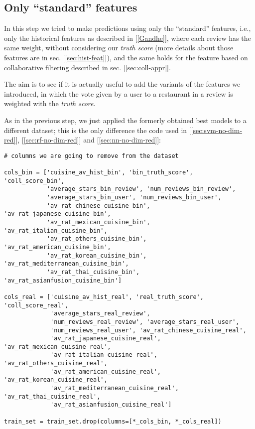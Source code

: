 \newpage
\subsection{Only ``standard'' features} \label{sec:only-std}

In this step we tried to make predictions using only the ``standard'' features, i.e., only the historical features as described in [\ref{Gandhe}], where each review has the same weight, without considering our \textit{truth score} (more details about those features are in sec. [\ref{sec:hist-feat}]), and the same holds for the feature based on collaborative filtering described in sec. [\ref{sec:coll-appr}].

The aim is to see if it is actually useful to add the variants of the features we introduced, in which the vote given by a user to a restaurant in a review is weighted with the \textit{truth score}.

As in the previous step, we just applied the formerly obtained best models to a different dataset; this is the only difference \wrt the code used in [\ref{sec:svm-no-dim-red}], [\ref{sec:rf-no-dim-red}] and [\ref{sec:nn-no-dim-red}]:
\begin{lstlisting}[caption={Removing non standard features},label={lst:only-std}]
# columns we are going to remove from the dataset

cols_bin = ['cuisine_av_hist_bin', 'bin_truth_score', 'coll_score_bin',
            'average_stars_bin_review', 'num_reviews_bin_review',
            'average_stars_bin_user', 'num_reviews_bin_user', 
            'av_rat_chinese_cuisine_bin', 'av_rat_japanese_cuisine_bin',
            'av_rat_mexican_cuisine_bin', 'av_rat_italian_cuisine_bin',
            'av_rat_others_cuisine_bin', 'av_rat_american_cuisine_bin',
            'av_rat_korean_cuisine_bin', 'av_rat_mediterranean_cuisine_bin',
            'av_rat_thai_cuisine_bin', 'av_rat_asianfusion_cuisine_bin']

cols_real = ['cuisine_av_hist_real', 'real_truth_score', 'coll_score_real',
             'average_stars_real_review', 
             'num_reviews_real_review', 'average_stars_real_user',
             'num_reviews_real_user', 'av_rat_chinese_cuisine_real',
             'av_rat_japanese_cuisine_real', 'av_rat_mexican_cuisine_real',
             'av_rat_italian_cuisine_real', 'av_rat_others_cuisine_real',
             'av_rat_american_cuisine_real', 'av_rat_korean_cuisine_real',
             'av_rat_mediterranean_cuisine_real', 'av_rat_thai_cuisine_real', 
             'av_rat_asianfusion_cuisine_real']

train_set = train_set.drop(columns=[*_cols_bin, *_cols_real])
\end{lstlisting}

